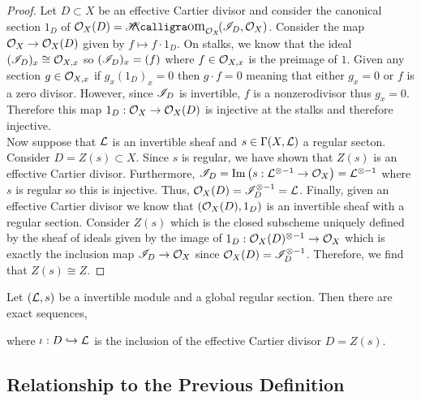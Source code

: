 \documentclass[12pt]{article}
\begin{document}
\begin{proof}
Let $D \subset X$ be an effective Cartier divisor and consider the canonical section $1_D$ of $\struct{X}(D) = \shHomover{\struct{X}}{\I_D}{\struct{X}}$. Consider the map $\mathcal{O}_{X} \to \mathcal{O}_{X}(D)$ given by $f \mapsto f \cdot 1_D$. On stalks, we know that the ideal $(\mathscr{I}_D)_x \cong \mathcal{O}_{X, x}$ so $(\mathscr{I}_D)_x = (f)$ where $f \in \mathcal{O}_{X, x}$ is the preimage of $1$. Given any section $g \in \mathcal{O}_{X, x}$ if $g_x (1_D)_x = 0$ then $g \cdot f = 0$ meaning that either $g_x = 0$ or $f$ is a zero divisor. However, since $\mathscr{I}_D$ is invertible, $f$ is a nonzerodivisor thus $g_x = 0$. Therefore this map $1_D : \mathcal{O}_{X} \to \mathcal{O}_{X}(D)$ is injective at the stalks and therefore injective.
\bigskip\\
Now suppose that $\mathcal{L}$ is an invertible sheaf and $s \in \Gamma(X, \mathcal{L})$ a regular secton. Consider $D = Z(s) \subset X$. Since $s$ is regular, we have shown that $Z(s)$ is an effective Cartier divisor. Furthermore, $\mathscr{I}_D = \mathrm{Im}\left( s : \mathcal{L}^{\otimes - 1} \to \mathcal{O}_{X} \right) = \mathcal{L}^{\otimes - 1}$ where $s$ is regular so this is injective. Thus, $\mathcal{O}_{X}(D) = \mathscr{I}_D^{\otimes - 1} = \mathcal{L}$. Finally, given an effective Cartier divisor we know that $(\mathcal{O}_{X}(D), 1_D)$ is an invertible sheaf with a regular section. Consider $Z(s)$ which is the closed subscheme uniquely defined by the sheaf of ideals given by the image of $1_D : \mathcal{O}_{X}(D)^{\otimes -1} \to \mathcal{O}_{X}$ which is exactly the inclusion map $\mathscr{I}_D \to \mathcal{O}_{X}$ since $\mathcal{O}_{X}(D) = \mathscr{I}_D^{\otimes -1}$. Therefore, we find that $Z(s) \cong Z$. 
\end{proof}

\begin{rmk}
Let $(\mathcal{L}, s)$ be a invertible module and a global regular section. Then there are exact sequences,
\begin{center}
\end{center}
where $\iota : D \hookrightarrow \mathcal{L}$ is the inclusion of the effective Cartier divisor $D = Z(s)$. 
\end{rmk}

\subsection{Relationship to the Previous Definition}
\end{document}

